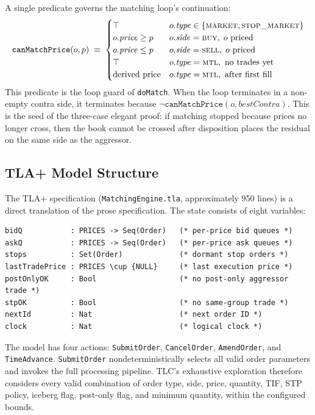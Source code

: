 \documentclass[11pt,a4paper]{article}
\begin{document}
A single predicate governs the matching loop's continuation:
\[
\texttt{canMatchPrice}(o, p) \;\equiv\;
\begin{cases}
\top & o.\mathit{type}\in\{\textsc{market},\textsc{stop\_market}\} \\
o.\mathit{price} \geq p & o.\mathit{side}=\textsc{buy},\; o\text{ priced} \\
o.\mathit{price} \leq p & o.\mathit{side}=\textsc{sell},\; o\text{ priced} \\
\top & o.\mathit{type}=\textsc{mtl},\text{ no trades yet} \\
\text{derived price} & o.\mathit{type}=\textsc{mtl},\text{ after first fill}
\end{cases}
\]
This predicate is the loop guard of \texttt{doMatch}. When the loop
terminates in a non-empty contra side, it terminates because
$\neg\texttt{canMatchPrice}(o, \mathit{bestContra})$. This is the seed
of the three-case elegant proof: if matching stopped because prices no
longer cross, then the book cannot be crossed after disposition places
the residual on the same side as the aggressor.

\subsection{TLA+ Model Structure}
\label{sec:model}

The TLA+ specification (\texttt{MatchingEngine.tla}, approximately 950
lines) is a direct translation of the prose specification. The state
consists of eight variables:

\begin{lstlisting}[language=tlaplus]
bidQ           : PRICES -> Seq(Order)   (* per-price bid queues *)
askQ           : PRICES -> Seq(Order)   (* per-price ask queues *)
stops          : Set(Order)             (* dormant stop orders *)
lastTradePrice : PRICES \cup {NULL}     (* last execution price *)
postOnlyOK     : Bool                   (* no post-only aggressor trade *)
stpOK          : Bool                   (* no same-group trade *)
nextId         : Nat                    (* next order ID *)
clock          : Nat                    (* logical clock *)
\end{lstlisting}

The model has four actions: \texttt{SubmitOrder}, \texttt{CancelOrder},
\texttt{AmendOrder}, and \texttt{TimeAdvance}. \texttt{SubmitOrder}
nondeterministically selects all valid order parameters and invokes the
full processing pipeline. TLC's exhaustive exploration therefore
considers every valid combination of order type, side, price, quantity,
TIF, STP policy, iceberg flag, post-only flag, and minimum quantity,
within the configured bounds.
\end{document}
